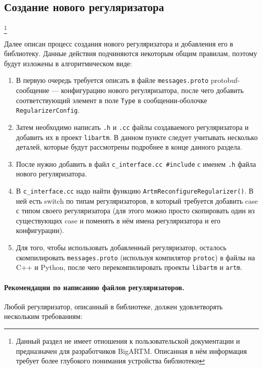 \subsection{Создание нового регуляризатора}
\footnote{Данный раздел не имеет отношения к пользовательской документации и предназначен для разработчиков BigARTM. Описанная в нём информация требует более глубокого понимания устройства библиотеки}

Далее описан процесс создания нового регуляризатора и добавления его в библиотеку. Данные действия подчиняются некоторым общим правилам, поэтому будут изложены в алгоритмическом виде:

\begin{enumerate}
	\item В первую очередь требуется описать в файле \verb'messages.proto' protobuf-сообщение ---  конфигурацию нового регуляризатора, после чего добавить соответствующий элемент в поле \verb'Type' в сообщении-оболочке \verb'RegularizerConfig'.
	
	\item Затем необходимо написать \verb'.h' и \verb'.cc' файлы создаваемого регуляризатора и добавить их в проект \verb'libartm'. В данном пункте следует учитывать несколько деталей, которые будут рассмотрены подробнее в конце данного раздела.
	
	\item После нужно добавить в файл \verb'c_interface.cc #include' с именем \verb'.h' файла нового регуляризатора.
	
	\item В  \verb'c_interface.cc' надо найти функцию \verb'ArtmReconfigureRegularizer()'. В ней есть switch по типам регуляризаторов, в который требуется добавить case с типом своего регуляризатора (для этого можно просто скопировать один из существующих case и поменять в нём имена регуляризатора и его конфигурации).
	
	\item Для того, чтобы использовать добавленный регуляризатор, осталось скомпилировать \verb'messages.proto' (используя компилятор \verb'protoc') в файлы на C++ и Python, после чего перекомпилировать проекты \verb'libartm' и \verb'artm'.
\end{enumerate}

\paragraph{Рекомендации по написанию файлов регуляризаторов.} Любой регуляризатор, описанный в библиотеке, должен удовлетворять нескольким требованиям:

